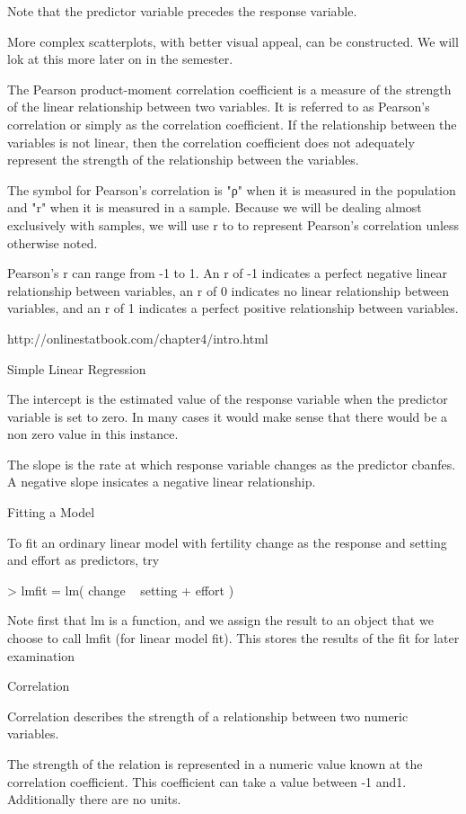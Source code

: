 Note that the predictor variable precedes the response variable.

More complex scatterplots, with better visual appeal, can be constructed. We will lok at this more later on in the semester.


The Pearson product-moment correlation coefficient is a measure of the strength of the linear relationship between two variables. It is referred to as Pearson's correlation or simply as the correlation coefficient. If the relationship between the variables is not linear, then the correlation coefficient does not adequately represent the strength of the relationship between the variables.

The symbol for Pearson's correlation is "ρ" when it is measured in the population and "r" when it is measured in a sample. Because we will be dealing almost exclusively with samples, we will use r to to represent Pearson's correlation unless otherwise noted.

Pearson's r can range from -1 to 1. An r of -1 indicates a perfect negative linear relationship between variables, an r of 0 indicates no linear relationship between variables, and an r of 1 indicates a perfect positive relationship between variables. 


http://onlinestatbook.com/chapter4/intro.html

Simple Linear Regression


The intercept is the estimated value of the response variable when the predictor variable is set to zero. In many cases it would make sense that there would be a non zero value in this instance.

The slope is the rate at which response variable changes as the predictor cbanfes. A negative slope insicates a negative linear relationship.

Fitting a Model

 To fit an ordinary linear model with fertility change as the response and setting and effort as predictors, try

 > lmfit = lm( change ~ setting + effort )

 Note first that lm is a function, and we assign the result to an object that we choose to call lmfit (for linear model fit). This stores the results of the fit for later examination


Correlation 

Correlation describes the strength of a relationship between two numeric variables.

The strength of the relation is represented in a numeric value known at the correlation coefficient. This coefficient can take a value between -1 and1. Additionally there are no units.

